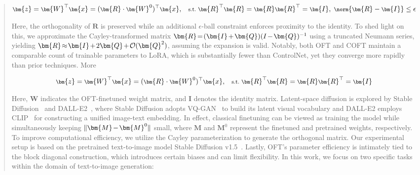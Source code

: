 \begin{abstract}
\begin{equation}\label{eq:coft_general}
    \footnotesize
    \bm{z}=\bm{W}^\top\bm{x}=(\bm{R}\cdot\bm{W}^0)^\top\bm{x},~~~\text{s.t.}~\bm{R}^\top\bm{R}=\bm{R}\bm{R}^\top=\bm{I},~\norm{\bm{R}-\bm{I}}\leq \epsilon
\end{equation}

Here, the orthogonality of $\bm{R}$ is preserved while an additional $\epsilon$-ball constraint enforces proximity to the identity. To shed light on this, we approximate the Cayley-transformed matrix $\thickmuskip=2mu \medmuskip=2mu \bm{R}=(\bm{I}+\bm{Q})(I-\bm{Q})^{-1}$ using a truncated Neumann series, yielding $\thickmuskip=2mu \medmuskip=2mu \bm{R}\approx\bm{I}+2\bm{Q}+\mathcal{O}(\bm{Q}^2)$, assuming the expansion is valid. Notably, both OFT and COFT maintain a comparable count of trainable parameters to LoRA, which is substantially fewer than ControlNet, yet they converge more rapidly than prior techniques. More

\begin{equation}\label{eq:oft_general}
    \footnotesize
    \bm{z}=\bm{W}^\top\bm{x}=(\bm{R}\cdot\bm{W}^0)^\top\bm{x},~~~\text{s.t.}~\bm{R}^\top\bm{R}=\bm{R}\bm{R}^\top=\bm{I}
\end{equation}

Here, $\bm{W}$ indicates the OFT-finetuned weight matrix, and $\bm{I}$ denotes the identity matrix. Latent-space diffusion is explored by Stable Diffusion~\cite{rombach2022high} and DALL-E2~\cite{ramesh2022hierarchical}, where Stable Diffusion adopts VQ-GAN~\cite{esser2021taming} to build its latent visual vocabulary and DALL-E2 employs CLIP~\cite{radford2021learning} for constructing a unified image-text embedding. In effect, classical finetuning can be viewed as training the model while simultaneously keeping $\thickmuskip=2mu \medmuskip=2mu \| \bm{M} - \bm{M}^0\|$ small, where $\bm{M}$ and $\bm{M}^0$ represent the finetuned and pretrained weights, respectively. To improve computational efficiency, we utilize the Cayley parameterization to generate the orthogonal matrix. Our experimental setup is based on the pretrained text-to-image model Stable Diffusion v1.5~\cite{rombach2022high}. Lastly, OFT’s parameter efficiency is intimately tied to the block diagonal construction, which introduces certain biases and can limit flexibility. In this work, we focus on two specific tasks within the domain of text-to-image generation:

\begin{itemize}[leftmargin=*,nosep]


\end{itemize}
\end{abstract}
